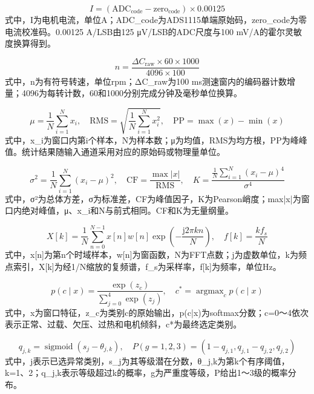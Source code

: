 \documentclass[UTF8]{ctexart}
\begin{document}
\begin{equation}
I=(\mathrm{ADC}_{\mathrm{code}}-\mathrm{zero}_{\mathrm{code}})\times0.00125
\tag{1}
\end{equation}
式中，I为电机电流，单位A；ADC\_code为ADS1115单端原始码，zero\_code为零电流校准码。0.00125 A/LSB由125 μV/LSB的ADC尺度与100 mV/A的霍尔灵敏度换算得到。

\begin{equation}
n=\frac{\Delta C_{\mathrm{raw}}\times60\times1000}{4096\times100}
\tag{2}
\end{equation}
式中，n为有符号转速，单位rpm；ΔC\_raw为100 ms测速窗内的编码器计数增量；4096为每转计数，60和1000分别完成分钟及毫秒单位换算。

\begin{equation}
\mu=\frac{1}{N}\sum_{i=1}^{N}x_i,\quad\mathrm{RMS}=\sqrt{\frac{1}{N}\sum_{i=1}^{N}x_i^2},\quad\mathrm{PP}=\max(x)-\min(x)
\tag{3}
\end{equation}
式中，x\_i为窗口内第i个样本，N为样本数；μ为均值，RMS为均方根，PP为峰峰值。统计结果随输入通道采用对应的原始码或物理量单位。

\begin{equation}
\sigma^2=\frac{1}{N}\sum_{i=1}^{N}(x_i-\mu)^2,\quad\mathrm{CF}=\frac{\max|x|}{\mathrm{RMS}},\quad K=\frac{\frac{1}{N}\sum_{i=1}^{N}(x_i-\mu)^4}{\sigma^4}
\tag{4}
\end{equation}
式中，σ²为总体方差，σ为标准差，CF为峰值因子，K为Pearson峭度；max|x|为窗口内绝对峰值，μ、x\_i和N与前式相同。CF和K为无量纲量。

\begin{equation}
X[k]=\frac{1}{N}\sum_{n=0}^{N-1}x[n]w[n]\exp\left(-\frac{\mathrm{j}2\pi kn}{N}\right),\quad f[k]=\frac{kf_s}{N}
\tag{5}
\end{equation}
式中，x[n]为第n个时域样本，w[n]为窗函数，N为FFT点数；j为虚数单位，k为频点索引，X[k]为经1/N缩放的复频谱，f\_s为采样率，f[k]为频率，单位Hz。

\begin{equation}
p(c\mid x)=\frac{\exp(z_c)}{\sum_{j=0}^{4}\exp(z_j)},\quad c^*=\mathop{\operatorname{argmax}}_c p(c\mid x)
\tag{6}
\end{equation}
式中，x为窗口特征，z\_c为类别c的原始输出，p(c|x)为softmax分数；c=0～4依次表示正常、过载、欠压、过热和电机倾斜，c*为最终选定类别。

\begin{equation}
q_{j,k}=\operatorname{sigmoid}(s_j-\theta_{j,k}),\quad P(g=1,2,3)=(1-q_{j,1},q_{j,1}-q_{j,2},q_{j,2})
\tag{7}
\end{equation}
式中，j表示已选异常类别，s\_j为其等级潜在分数，θ\_j,k为第k个有序阈值，k=1、2；q\_j,k表示等级超过k的概率，g为严重度等级，P给出1～3级的概率分布。
\end{document}
